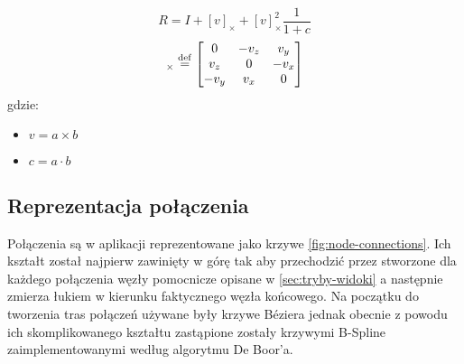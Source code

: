 \newcommand\dotProd{a \cdot b}
\newcommand\crossProd[1]{(\overrightarrow{a \times b})_#1}
\begin{equation}
	R = I + [v]_{\times} + [v]_{\times}^2\frac{1}{1 + c}
\end{equation}
\begin{equation}
	[v]_{\times} \stackrel{\rm def}{=} 
	\begin{bmatrix}
		0 & -v_z & v_y\\
		v_z & 0 & -v_x\\
		-v_y & v_x & 0
	\end{bmatrix}
\end{equation}
gdzie:
\begin{itemize}
	\item \(v = a \times b\)
	\item \(c = a \cdot b\)
\end{itemize}

\subsection{Reprezentacja połączenia}
Połączenia są w aplikacji reprezentowane jako krzywe \ref{fig:node-connections}. Ich kształt został najpierw zawinięty w górę tak aby przechodzić przez stworzone dla każdego połączenia węzły pomocnicze opisane w \ref{sec:tryby-widoki} a następnie zmierza łukiem w kierunku faktycznego węzła końcowego. Na początku do tworzenia tras połączeń używane były krzywe Béziera jednak obecnie z powodu ich skomplikowanego kształtu zastąpione zostały krzywymi B-Spline zaimplementowanymi według algorytmu De Boor'a.

